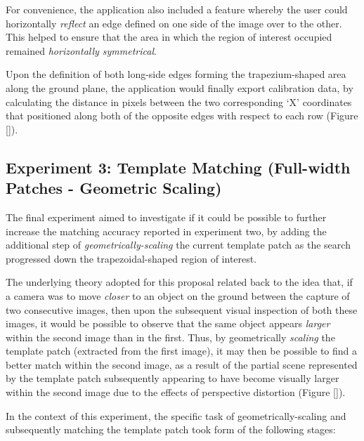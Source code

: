 For convenience, the application also included a feature whereby the user could horizontally \textit{reflect} an edge defined on one side of the image over to the other. This helped to ensure that the area in which the region of interest occupied remained \textit{horizontally symmetrical}.

Upon the definition of both long-side edges forming the trapezium-shaped area along the ground plane, the application would finally export calibration data, by calculating the distance in pixels between the two corresponding `X' coordinates that positioned along both of the opposite edges with respect to each row (Figure \ref{}).

\subsection{Experiment 3: Template Matching (Full-width Patches - Geometric Scaling)}
\label{tm-scaled}

The final experiment aimed to investigate if it could be possible to further increase the matching accuracy reported in experiment two, by adding the additional step of \textit{geometrically-scaling} the current template patch as the search progressed down the trapezoidal-shaped region of interest.

The underlying theory adopted for this proposal related back to the idea that, if a camera was to move \textit{closer} to an object on the ground between the capture of two consecutive images, then upon the subsequent visual inspection of both these images, it would be possible to observe that the same object appears \textit{larger} within the second image than in the first. Thus, by geometrically \textit{scaling} the template patch (extracted from the first image), it may then be possible to find a better match within the second image, as a result of the partial scene represented by the template patch subsequently appearing to have become visually larger within the second image due to the effects of perspective distortion (Figure \ref{}).

In the context of this experiment, the specific task of geometrically-scaling and subsequently matching the template patch took form of the following stages:

